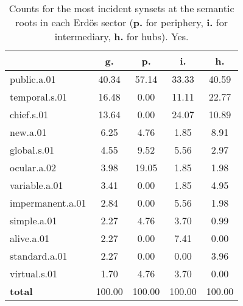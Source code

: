 \begin{table}[h!]
\begin{center}
\begin{tabular}{| l || c | c | c | c |}\hline
 & {\bf g.} & {\bf p.} & {\bf i.} & {\bf h.} \\\hline\hline
public.a.01 & 40.34  & 57.14  & 33.33  & 40.59 \\\hline
temporal.s.01 & 16.48  & 0.00  & 11.11  & 22.77 \\\hline
chief.s.01 & 13.64  & 0.00  & 24.07  & 10.89 \\\hline
new.a.01 & 6.25  & 4.76  & 1.85  & 8.91 \\\hline
global.s.01 & 4.55  & 9.52  & 5.56  & 2.97 \\\hline
ocular.a.02 & 3.98  & 19.05  & 1.85  & 1.98 \\\hline
variable.a.01 & 3.41  & 0.00  & 1.85  & 4.95 \\\hline
impermanent.a.01 & 2.84  & 0.00  & 5.56  & 1.98 \\\hline
simple.a.01 & 2.27  & 4.76  & 3.70  & 0.99 \\\hline
alive.a.01 & 2.27  & 0.00  & 7.41  & 0.00 \\\hline
standard.a.01 & 2.27  & 0.00  & 0.00  & 3.96 \\\hline
virtual.s.01 & 1.70  & 4.76  & 3.70  & 0.00 \\\hline\hline
{{\bf total}} & 100.00  & 100.00  & 100.00  & 100.00 \\\hline
\end{tabular}
\caption{Counts for the most incident synsets at the semantic roots in each Erd\"os sector ({\bf p.} for periphery, {\bf i.} for intermediary, {\bf h.} for hubs). Yes.}
\end{center}
\end{table}